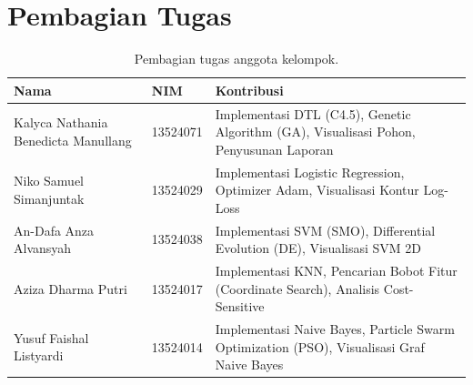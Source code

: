 \documentclass[12pt,a4paper]{article}
\begin{document}
\section{Pembagian Tugas}
\begin{table}[H]\centering\small
\begin{tabularx}{\textwidth}{>{\raggedright\arraybackslash}p{4cm}lX}
\toprule
Nama & NIM & Kontribusi \\
\midrule
Kalyca Nathania Benedicta Manullang & 13524071 & Implementasi DTL (C4.5), Genetic Algorithm (GA), Visualisasi Pohon, Penyusunan Laporan \\
Niko Samuel Simanjuntak & 13524029 & Implementasi Logistic Regression, Optimizer Adam, Visualisasi Kontur Log-Loss \\
An-Dafa Anza Alvansyah & 13524038 & Implementasi SVM (SMO), Differential Evolution (DE), Visualisasi SVM 2D \\
Aziza Dharma Putri & 13524017 & Implementasi KNN, Pencarian Bobot Fitur (Coordinate Search), Analisis Cost-Sensitive \\
Yusuf Faishal Listyardi & 13524014 & Implementasi Naive Bayes, Particle Swarm Optimization (PSO), Visualisasi Graf Naive Bayes \\
\bottomrule
\end{tabularx}
\caption{Pembagian tugas anggota kelompok.}
\end{table}
\end{document}
